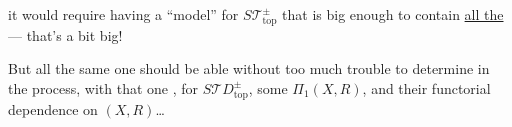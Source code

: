 it would require having a ``model'' for $S\mathcal T_{\mathrm{top}}^\pm$ that is big enough to contain  \uline{all the } --- that's a bit big!

But all the same one should be able without too much trouble to determine in the process, with  that one , for $S\mathcal TD_{\mathrm{top}}^\pm$, some  $\Pi_1(X,R)$, and their functorial dependence on $(X,R)$\ldots
{}
